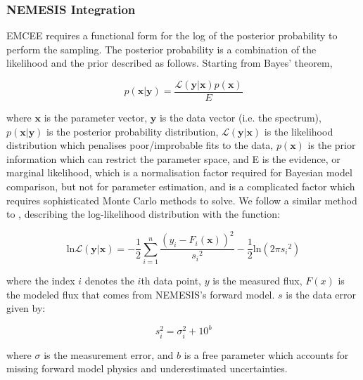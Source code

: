 \documentclass[11pt, a4paper,titlepage]{report}
\newcommand{\Lagr}{\mathcal{L}}
\begin{document}
\subsubsection{NEMESIS Integration} \label{subsub:emceeint}

EMCEE requires a functional form for the log of the posterior probability to perform the sampling. The posterior probability is a combination of the likelihood and the prior described as follows. Starting from Bayes' theorem,

\begin{equation}
p(\bm{x} | \bm{y}) = \frac{\Lagr(\bm{y} | \bm{x}) p(\bm{x})}{E}
\end{equation}

where $\bm{x}$ is the parameter vector,  $\bm{y}$ is the data vector (i.e. the spectrum),  $p(\bm{x} | \bm{y})$ is the posterior probability distribution,  $\Lagr(\bm{y} | \bm{x})$ is the likelihood distribution which penalises poor/improbable fits to the data, $p(\bm{x})$ is the prior information which can restrict the parameter space, and E is the evidence, or marginal likelihood, which is a normalisation factor required for Bayesian model comparison, but not for parameter estimation, and is a complicated factor which requires sophisticated Monte Carlo methods to solve. We follow a similar method to \citet{line15}, describing the log-likelihood distribution with the function:

\begin{equation} \label{eqn:likelihood}
\mathrm{ln} \Lagr(\bm{y} | \bm{x}) = - \frac{1}{2} \displaystyle\sum_{i=1}^{n} \frac{(y_i - F_i(\bm{x}))^2}{s{_i}^2} - \frac{1}{2} \mathrm{ln}(2 \pi s{_i}^2)
\end{equation}


where the index $i$ denotes the $i$th data point, $y$ is the measured flux, $F(x)$ is the modeled flux that comes from NEMESIS's forward model. $s$ is the data error given by: 

\begin{equation}
s_i^2 = \sigma_i^2 + 10^b
\end{equation}

where $\sigma$ is the measurement error, and $b$ is a free parameter which accounts for missing forward model physics and underestimated uncertainties. 
\end{document}
